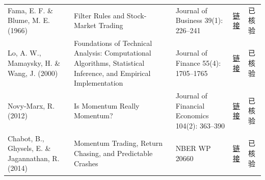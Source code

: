 \begin{longtable}{@{}>{\raggedright\arraybackslash}p{2.55cm}>{\raggedright\arraybackslash}p{4.7cm}>{\raggedright\arraybackslash}p{2.7cm}>{\raggedright\arraybackslash}p{1.9cm}>{\raggedright\arraybackslash}p{1.45cm}@{}}
Fama, E. F. \& Blume, M. E. (1966) & Filter Rules and Stock-Market Trading & Journal of Business 39(1): 226--241 & \href{https://doi.org/10.1086/294849}{链接} & 已核验 \\
Lo, A. W., Mamaysky, H. \& Wang, J. (2000) & Foundations of Technical Analysis: Computational Algorithms, Statistical Inference, and Empirical Implementation & Journal of Finance 55(4): 1705--1765 & \href{https://doi.org/10.1111/0022-1082.00265}{链接} & 已核验 \\
Novy-Marx, R. (2012) & Is Momentum Really Momentum? & Journal of Financial Economics 104(2): 363--390 & \href{https://doi.org/10.1016/j.jfineco.2011.05.003}{链接} & 已核验 \\
Chabot, B., Ghysels, E. \& Jagannathan, R. (2014) & Momentum Trading, Return Chasing, and Predictable Crashes & NBER WP 20660 & \href{https://doi.org/10.3386/w20660}{链接} & 已核验 \\
\end{longtable}
